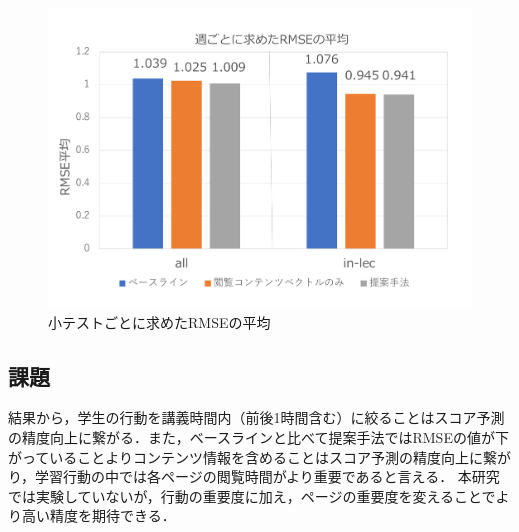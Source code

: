 \documentclass[platex,dvipdfmx,a4paper,twocolumn,base=10pt,jbase=10pt,ja=standard]{bxjsarticle}
\begin{document}

\begin{figure}[tbp]
  \centering
  \includegraphics[width=\linewidth]{RMSE_.pdf}
  \caption{小テストごとに求めたRMSEの平均}
  \label{fig:rmse}
  \vspace{-5mm}
\end{figure}





\subsection{課題}
結果から，学生の行動を講義時間内（前後1時間含む）に絞ることはスコア予測の精度向上に繋がる．また，ベースラインと比べて提案手法ではRMSEの値が下がっていることよりコンテンツ情報を含めることはスコア予測の精度向上に繋がり，学習行動の中では各ページの閲覧時間がより重要であると言える．
本研究では実験していないが，行動の重要度に加え，ページの重要度を変えることでより高い精度を期待できる．
\end{document}
